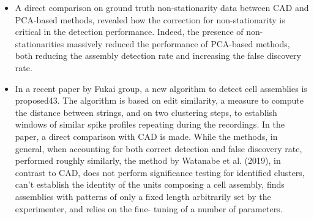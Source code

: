 \begin{itemize}
    \item A direct comparison on ground truth non-stationarity data between CAD and PCA-based methods, revealed how the correction for non-stationarity is critical in the detection performance. Indeed, the presence of non-stationarities massively reduced the performance of PCA-based methods, both reducing the assembly detection rate and increasing the false discovery rate.
\item In a recent paper by Fukai group, a new algorithm to detect cell assemblies is proposed43. The algorithm is based on edit similarity, a measure to compute the distance between strings, and on two clustering steps, to establish windows of similar spike profiles repeating during the recordings. In the paper, a direct comparison with CAD is made. While the methods, in general, when accounting for both correct detection and false discovery rate, performed roughly similarly, the method by Watanabe et al. (2019), in contrast to CAD, does not perform significance testing for identified clusters, can’t establish the identity of the units composing a cell assembly, finds assemblies with patterns of only a fixed length arbitrarily set by the experimenter, and relies on the fine- tuning of a number of parameters.
\end{itemize}

